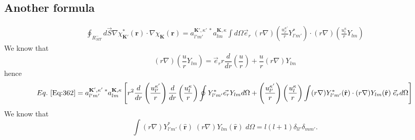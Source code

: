 \documentclass[aps,prb,floatfix,epsfig,singlecolumn,showpacs,preprintnumbers]{revtex4}
\renewcommand{\vr}{{\mathbf{r}}}
\newcommand{\vK}{{\mathbf{K}}}
\begin{document}
\subsection{Another formula}

\begin{eqnarray}
\oint_{R_{MT}^-} d\vec{S}  \nabla\chi^*_{\vK'}(\vr)\cdot\nabla\chi_\vK(\vr)=
a_{l'm'}^{\vK',\kappa'\;*} a_{lm}^{\vK,\kappa} \int d\Omega  \vec{e}_r \;
(r\nabla)\left(\frac{u_{l'}^{\kappa'}}{r}Y_{l'm'}^*\right)\cdot
(r\nabla)\left(\frac{u_{l}^{\kappa}}{r}Y_{lm}\right)
\label{Eq:362}
\end{eqnarray}
We know that
$$(r\nabla) \left(\frac{u}{r}Y_{lm}\right)=\vec{e}_r r\frac{d}{dr}\left(\frac{u}{r}\right)+\frac{u}{r}(r\nabla)Y_{lm}$$
hence
\begin{eqnarray}
Eq.~\ref{Eq:362}=
a_{l'm'}^{\vK',\kappa'\;*} a_{lm}^{\vK,\kappa} 
\left[
r^2
\frac{d}{dr} \left(\frac{u_{l'}^{\kappa'}}{r}\right)
\frac{d}{dr} \left(\frac{u_{l}^{\kappa}}{r}\right)
\oint Y_{l'm'}^* \vec{e_r} Y_{lm}d\Omega
+
\left(\frac{u_{l'}^{\kappa'}}{r}\right)
\left(\frac{u_{l}^{\kappa}}{r}\right)
\int (r\nabla)Y^*_{l'm'}(\hat{\vr})\cdot (r\nabla)Y_{lm}(\hat{\vr})\; \vec{e}_r d\Omega 
\right]
\nonumber
\end{eqnarray}
We know that
$$\int (r\nabla)Y^*_{l'm'}(\hat{\vr})\; (r\nabla)Y_{lm}(\hat{\vr})\; d\Omega =l(l+1)\delta_{ll'}\delta_{mm'}.$$
\end{document}
